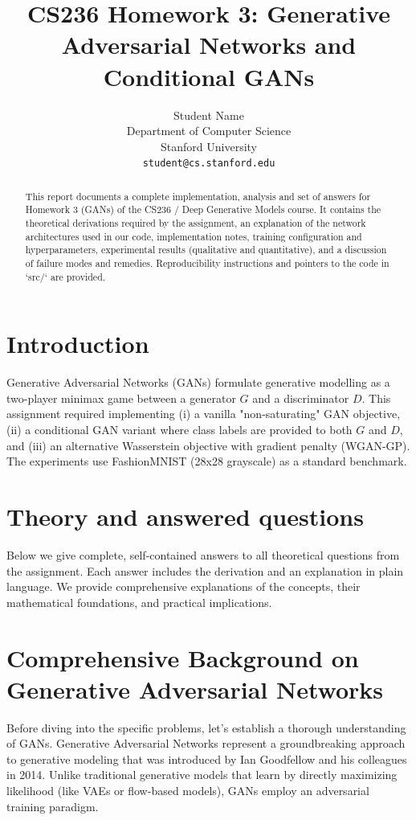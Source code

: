 \documentclass{article}
\title{CS236 Homework 3: Generative Adversarial Networks and Conditional GANs}
\author{
  Student Name \\
  Department of Computer Science\\
  Stanford University\\
  \texttt{student@cs.stanford.edu}
}
\begin{document}
\maketitle

\begin{abstract}
This report documents a complete implementation, analysis and set of answers for Homework 3 (GANs) of the CS236 / Deep Generative Models course. It contains the theoretical derivations required by the assignment, an explanation of the network architectures used in our code, implementation notes, training configuration and hyperparameters, experimental results (qualitative and quantitative), and a discussion of failure modes and remedies. Reproducibility instructions and pointers to the code in `src/` are provided.
\end{abstract}

\section{Introduction}
Generative Adversarial Networks (GANs) formulate generative modelling as a two-player minimax game between a generator $G$ and a discriminator $D$. This assignment required implementing (i) a vanilla "non-saturating" GAN objective, (ii) a conditional GAN variant where class labels are provided to both $G$ and $D$, and (iii) an alternative Wasserstein objective with gradient penalty (WGAN-GP). The experiments use FashionMNIST (28x28 grayscale) as a standard benchmark.

\section{Theory and answered questions}
Below we give complete, self-contained answers to all theoretical questions from the assignment. Each answer includes the derivation and an explanation in plain language. We provide comprehensive explanations of the concepts, their mathematical foundations, and practical implications.

\section{Comprehensive Background on Generative Adversarial Networks}

Before diving into the specific problems, let's establish a thorough understanding of GANs. Generative Adversarial Networks represent a groundbreaking approach to generative modeling that was introduced by Ian Goodfellow and his colleagues in 2014. Unlike traditional generative models that learn by directly maximizing likelihood (like VAEs or flow-based models), GANs employ an adversarial training paradigm.
\end{document}
